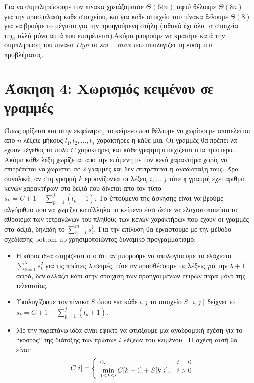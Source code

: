 \documentclass[a4paper,12pt]{report}
\begin{document}
Για να συμπληρώσουμε τον πίνακα χρειάζομαστε $\Theta(64n)$ αφού θέλουμε $\Theta(8n)$ για την προσπέλαση κάθε στοιχείου, και για κάθε στοιχείο του πίνακα θέλουμε $\Theta(8)$ για να βρούμε το μέγιστο για την προηγούμενη στήλη (πιθανά όχι όλα τα στοιχεία της, αλλά μόνο αυτά που επιτρέπεται).Ακόμα μπορούμε να κρατάμε κατά την συμπλήρωση του πίνακα $Dyn$ το $sol=max$ που υπολογίζει τη λύση του προβλήματος.  

\section*{Άσκηση 4: Χωρισμός κειμένου σε γραμμές}
Όπως ορίζεται και στην εκφώνηση, το κείμενο που θέλουμε να χωρίσουμε αποτελείται απο $n$ λέξεις μήκους $l_1,l_2,...,l_n$ χαρακτήρες η κάθε μια. Οι γραμμές θα πρέπει να έχουν μέγεθος το πολύ $C$ χαρακτήρες και κάθε γραμμή στοιχίζεται στα αριστερά. Ακόμα κάθε λέξη χωρίζεται απο την επόμενη με τον κενό χαρακτήρα χωρίς να επιτρέπεται να χωριστεί σε 2 γραμμές και δεν επιτρέπεται η αναδιάταξη τους. Άρα συνολικά, αν στη γραμμή $k$ εμφανίζονται οι λέξεις $i,...,j$ τότε η γραμμή έχει αριθμό κενών χαρακτήρων στα δεξιά που δίνεται απο τον τύπο $s_k=C+1-\sum_{p=1}^{j}{(l_p+1)}$. Το ζητούμενο της άσκησης είναι να βρούμε αλγόριθμο που να χωρίζει κατάλληλα το κείμενο έτσι ώστε να ελαχιστοποιείται το άθροισμα των τετραγώνων του πλήθους των κενών χαρακτήρων που έχουν οι γραμμές στα δεξιά, δηλαδή το $\sum_{k=1}^{m}{s_k^2}$. Για την επίλυση θα εργαστούμε με την μέθοδο σχεδίασης bottom-up χρησιμοποιώντας δυναμικό προγραμματισμό:

\begin{itemize}
 \item Η κύρια ιδέα στηρίζεται στο ότι αν μπορούμε να υπολογίσουμε το ελάχιστο $\sum_{k=1}^{\lambda}{s_k^2}$ για τις πρώτες $\lambda$ σειρές, τότε αν προσθέσουμε τις λέξεις για την $\lambda+1$ σειρά, δεν αλλάζει κάτι στην στοίχιση των προηγούμενων σειρών παρα μόνο της τελευταίας.
 \item Υπολογίζουμε τον πίνακα $S$ όπου για κάθε $i,j$ το στοιχείο $S[i,j]$ δείχνει το $s_k=C+1-\sum_{p=1}^{j}{(l_p+1)}$.
 \item Με την παραπάνω ιδέα είναι εφικτό να φτιάξουμε μια αναδρομική σχέση για το ``κόστος'' της διάταξης των πρώτων $i$ λέξεων του κειμένου . Η σχέση αυτή θα είναι:
  $$
   C[i]=\left\{\begin{array}{l l}
           0, & i=0 \\
	  \displaystyle \min_{1 \leq k \leq i}C[k-1]+S[k,i], & i>0
          \end{array} \right.
  $$ 

\end{itemize}
\end{document}
